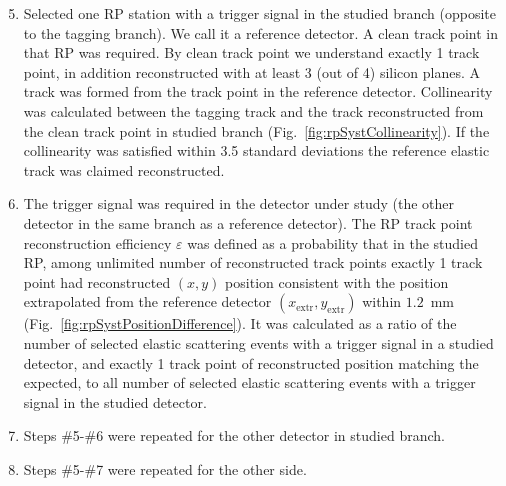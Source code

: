 \begin{enumerate}\setcounter{enumi}{4}%
\item Selected one RP station with a trigger signal in the studied branch (opposite to the tagging branch). We call it a reference detector. A clean track point in that RP was required. By clean track point we understand exactly 1 track point, in addition reconstructed with at least 3 (out of 4) silicon planes. A track was formed from the track point in the reference detector. Collinearity was calculated between the tagging track and the track reconstructed from the clean track point in studied branch (Fig.~\ref{fig:rpSystCollinearity}). If the collinearity was satisfied within 3.5 standard deviations the reference elastic track was claimed reconstructed.\vspace{-4pt}
\item The trigger signal was required in the detector under study (the other detector in the same branch as a reference detector). The RP track point reconstruction efficiency $\varepsilon$ was defined as a probability that in the studied RP, among unlimited number of reconstructed track points exactly 1 track point had reconstructed $(x,y)$ position consistent with the position extrapolated from the reference detector $(x_{\text{extr}},y_{\text{extr}})$ within $1.2$~mm (Fig.~\ref{fig:rpSystPositionDifference}). It was calculated as a ratio of the number of selected elastic scattering events with a trigger signal in a studied detector, and exactly 1 track point of reconstructed position matching the expected, to all number of selected elastic scattering events with a trigger signal in the studied detector.\vspace{-4pt}
\item Steps \#5-\#6 were repeated for the other detector in studied branch.\vspace{-4pt}
\item Steps \#5-\#7 were repeated for the other side.
\end{enumerate}

